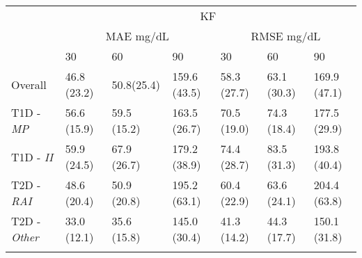 \begin{table}[b!]
\begin{tabular}{lllllll}
			\\
			& \multicolumn{6}{c}{KF}                                                \\ \cline{2-7}
			\multicolumn{1}{l|}{}                           & \multicolumn{3}{c|}{MAE mg/dL}          & \multicolumn{3}{c|}{RMSE mg/dL}         \\ \cline{2-7}
			\multicolumn{1}{l|}{}                           & 30 & 60 & \multicolumn{1}{l|}{90} & 30 & 60 & \multicolumn{1}{l|}{90} \\ \hline
			\multicolumn{1}{l|}{Overall}              & 46.8 (23.2) & 50.8(25.4) & \multicolumn{1}{l|}{159.6 (43.5)} & 58.3 (27.7) & 63.1 (30.3) & \multicolumn{1}{l|}{169.9 (47.1)} \\
			\multicolumn{1}{l|}{T1D - {\sl MP}}         & 56.6 (15.9) & 59.5 (15.2) & \multicolumn{1}{l|}{163.5 (26.7)} & 70.5 (19.0) & 74.3 (18.4) & \multicolumn{1}{l|}{177.5 (29.9)} \\
			\multicolumn{1}{l|}{T1D - {\sl II}}    & 59.9 (24.5) & 67.9 (26.7) & \multicolumn{1}{l|}{179.2 (38.9)} & 74.4 (28.7) & 83.5 (31.3) & \multicolumn{1}{l|}{193.8 (40.4)} \\
			\multicolumn{1}{l|}{T2D - {\sl RAI}} & 48.6 (20.4) & 50.9 (20.8) & \multicolumn{1}{l|}{195.2 (63.1)} & 60.4 (22.9) & 63.6 (24.1) & \multicolumn{1}{l|}{204.4 (63.8)} \\
			\multicolumn{1}{l|}{T2D - {\sl Other}}      & 33.0 (12.1) & 35.6 (15.8) & \multicolumn{1}{l|}{145.0 (30.4)} & 41.3 (14.2) & 44.3 (17.7) & \multicolumn{1}{l|}{150.1 (31.8)} \\ \hline
			
			
			\\
			

\end{tabular}
\end{table}
